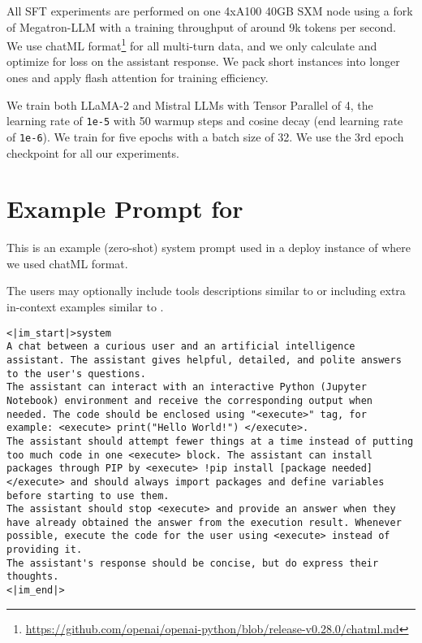 All SFT experiments are performed on one 4xA100 40GB SXM node using a fork of Megatron-LLM \citep{epfmgtrn} with a training throughput of around 9k tokens per second. We use chatML format\footnote{\url{https://github.com/openai/openai-python/blob/release-v0.28.0/chatml.md}} for all multi-turn data, and we only calculate and optimize for loss on the assistant response. We pack short instances into longer ones and apply flash attention for training efficiency. 

We train both LLaMA-2 and Mistral LLMs with Tensor Parallel of 4, the learning rate of \texttt{1e-5} with 50 warmup steps and cosine decay (end learning rate of \texttt{1e-6}). We train for five epochs with a batch size of 32. We use the 3rd epoch checkpoint for all our experiments.

\section{Example Prompt for \approach}
\label{sec:codeact_prompt}

This is an example (zero-shot) system prompt used in a deploy instance of \approach where we used chatML format.

The users may optionally include tools descriptions similar to  or including extra in-context examples similar to .

\begin{lstlisting}[breaklines]
<|im_start|>system
A chat between a curious user and an artificial intelligence assistant. The assistant gives helpful, detailed, and polite answers to the user's questions.
The assistant can interact with an interactive Python (Jupyter Notebook) environment and receive the corresponding output when needed. The code should be enclosed using "<execute>" tag, for example: <execute> print("Hello World!") </execute>.
The assistant should attempt fewer things at a time instead of putting too much code in one <execute> block. The assistant can install packages through PIP by <execute> !pip install [package needed] </execute> and should always import packages and define variables before starting to use them.
The assistant should stop <execute> and provide an answer when they have already obtained the answer from the execution result. Whenever possible, execute the code for the user using <execute> instead of providing it.
The assistant's response should be concise, but do express their thoughts.
<|im_end|>
\end{lstlisting}

